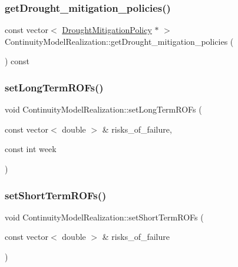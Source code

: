 \subsubsection{\texorpdfstring{get\+Drought\+\_\+mitigation\+\_\+policies()}{getDrought\_mitigation\_policies()}}
{\footnotesize\ttfamily const vector$<$ \mbox{\hyperlink{classDroughtMitigationPolicy}{Drought\+Mitigation\+Policy}} $\ast$ $>$ Continuity\+Model\+Realization\+::get\+Drought\+\_\+mitigation\+\_\+policies (\begin{DoxyParamCaption}{ }\end{DoxyParamCaption}) const}

\mbox{\label{classContinuityModelRealization_a45cde9269efee4dc94f4905769983c9f_a45cde9269efee4dc94f4905769983c9f}} 
\subsubsection{\texorpdfstring{set\+Long\+Term\+R\+O\+Fs()}{setLongTermROFs()}}
{\footnotesize\ttfamily void Continuity\+Model\+Realization\+::set\+Long\+Term\+R\+O\+Fs (\begin{DoxyParamCaption}\item[{const vector$<$ double $>$ \&}]{risks\+\_\+of\+\_\+failure,  }\item[{const int}]{week }\end{DoxyParamCaption})}

\mbox{\label{classContinuityModelRealization_a2db1784f020ed147335894022e20e457_a2db1784f020ed147335894022e20e457}} 
\subsubsection{\texorpdfstring{set\+Short\+Term\+R\+O\+Fs()}{setShortTermROFs()}}
{\footnotesize\ttfamily void Continuity\+Model\+Realization\+::set\+Short\+Term\+R\+O\+Fs (\begin{DoxyParamCaption}\item[{const vector$<$ double $>$ \&}]{risks\+\_\+of\+\_\+failure }\end{DoxyParamCaption})}



